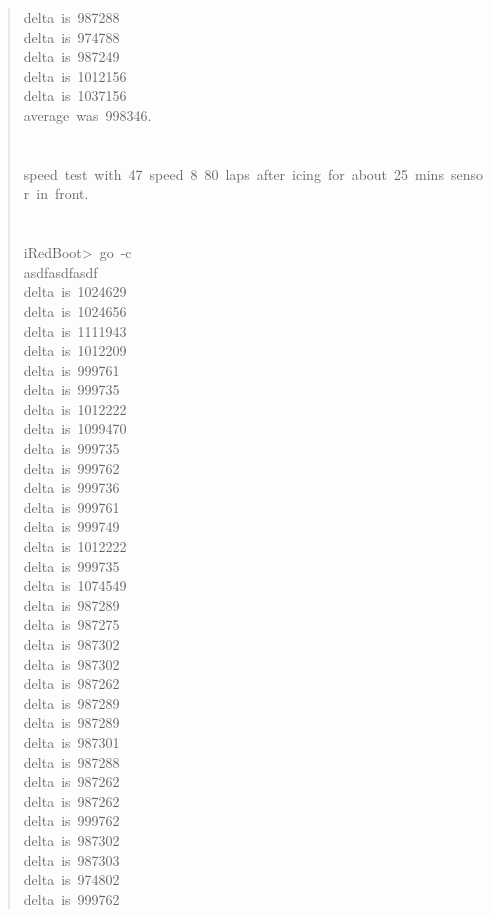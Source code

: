 \documentclass[letterpaper]{article}
\begin{document}
\begin{quote}
{delta~is~987288\\
delta~is~974788\\
delta~is~987249\\
delta~is~1012156\\
delta~is~1037156\\
average~was~998346.\\
~\\
~\\
speed~test~with~47~speed~8~80~laps~after~icing~for~about~25~mins~sensor~in~front.\\
~\\
~\\
iRedBoot>~go~-c\\
asdfasdfasdf\\
delta~is~1024629\\
delta~is~1024656\\
delta~is~1111943\\
delta~is~1012209\\
delta~is~999761\\
delta~is~999735\\
delta~is~1012222\\
delta~is~1099470\\
delta~is~999735\\
delta~is~999762\\
delta~is~999736\\
delta~is~999761\\
delta~is~999749\\
delta~is~1012222\\
delta~is~999735\\
delta~is~1074549\\
delta~is~987289\\
delta~is~987275\\
delta~is~987302\\
delta~is~987302\\
delta~is~987262\\
delta~is~987289\\
delta~is~987289\\
delta~is~987301\\
delta~is~987288\\
delta~is~987262\\
delta~is~987262\\
delta~is~999762\\
delta~is~987302\\
delta~is~987303\\
delta~is~974802\\
delta~is~999762\\
}
\end{quote}
\end{document}
